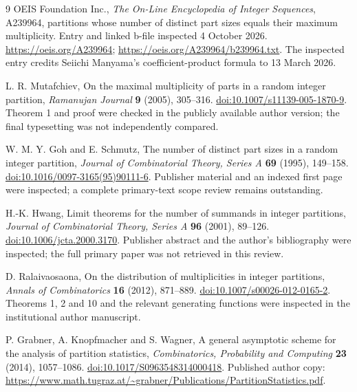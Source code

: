 \documentclass[11pt,letterpaper]{article}
\numberwithin{equation}{section}
\theoremstyle{definition}\newtheorem{definition}[theorem]{Definition}
\theoremstyle{remark}\newtheorem{remark}[theorem]{Remark}
\begin{document}
\clearpage
\begin{thebibliography}{9}
OEIS Foundation Inc., \emph{The On-Line Encyclopedia of Integer Sequences}, A239964, partitions whose number of distinct part sizes equals their maximum multiplicity. Entry and linked b-file inspected 4 October 2026.
\url{https://oeis.org/A239964};
\url{https://oeis.org/A239964/b239964.txt}.
The inspected entry credits Seiichi Manyama's coefficient-product formula to 13 March 2026.

L. R. Mutafchiev, On the maximal multiplicity of parts in a random integer partition, \emph{Ramanujan Journal} \textbf{9} (2005), 305--316.
\href{https://doi.org/10.1007/s11139-005-1870-9}{doi:10.1007/s11139-005-1870-9}.
Theorem 1 and proof were checked in the publicly available author version; the final typesetting was not independently compared.

W. M. Y. Goh and E. Schmutz, The number of distinct part sizes in a random integer partition, \emph{Journal of Combinatorial Theory, Series A} \textbf{69} (1995), 149--158.
\href{https://doi.org/10.1016/0097-3165(95)90111-6}{doi:10.1016/0097-3165(95)90111-6}.
Publisher material and an indexed first page were inspected; a complete primary-text scope review remains outstanding.

H.-K. Hwang, Limit theorems for the number of summands in integer partitions, \emph{Journal of Combinatorial Theory, Series A} \textbf{96} (2001), 89--126.
\href{https://doi.org/10.1006/jcta.2000.3170}{doi:10.1006/jcta.2000.3170}.
Publisher abstract and the author's bibliography were inspected; the full primary paper was not retrieved in this review.

D. Ralaivaosaona, On the distribution of multiplicities in integer partitions, \emph{Annals of Combinatorics} \textbf{16} (2012), 871--889.
\href{https://doi.org/10.1007/s00026-012-0165-2}{doi:10.1007/s00026-012-0165-2}.
Theorems 1, 2 and 10 and the relevant generating functions were inspected in the institutional author manuscript.

P. Grabner, A. Knopfmacher and S. Wagner, A general asymptotic scheme for the analysis of partition statistics, \emph{Combinatorics, Probability and Computing} \textbf{23} (2014), 1057--1086.
\href{https://doi.org/10.1017/S0963548314000418}{doi:10.1017/S0963548314000418}.
Published author copy:
\url{https://www.math.tugraz.at/~grabner/Publications/PartitionStatistics.pdf}.
\end{thebibliography}
\end{document}
